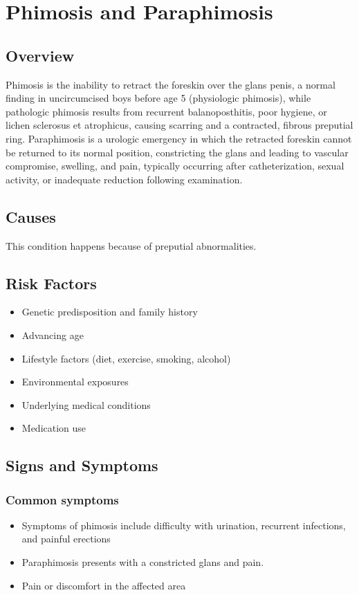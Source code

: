 \chapter{Phimosis and Paraphimosis}
\label{sec:Phimosis and Paraphimosis}

\section{Overview}
Phimosis is the inability to retract the foreskin over the glans penis, a normal finding in uncircumcised boys before age 5 (physiologic phimosis), while pathologic phimosis results from recurrent balanoposthitis, poor hygiene, or lichen sclerosus et atrophicus, causing scarring and a contracted, fibrous preputial ring. Paraphimosis is a urologic emergency in which the retracted foreskin cannot be returned to its normal position, constricting the glans and leading to vascular compromise, swelling, and pain, typically occurring after catheterization, sexual activity, or inadequate reduction following examination.
\section{Causes}
This condition happens because of preputial abnormalities.     
\section{Risk Factors}

\begin{itemize}[noitemsep]
  \item Genetic predisposition and family history
  \item Advancing age
  \item Lifestyle factors (diet, exercise, smoking, alcohol)
  \item Environmental exposures
  \item Underlying medical conditions
  \item Medication use
\end{itemize}
\section{Signs and Symptoms}

\subsection{Common symptoms}
\begin{itemize}[noitemsep]
  \item Symptoms of phimosis include difficulty with urination, recurrent infections, and painful erections
  \item Paraphimosis presents with a constricted glans and pain.
  \item Pain or discomfort in the affected area
  \end{itemize}


